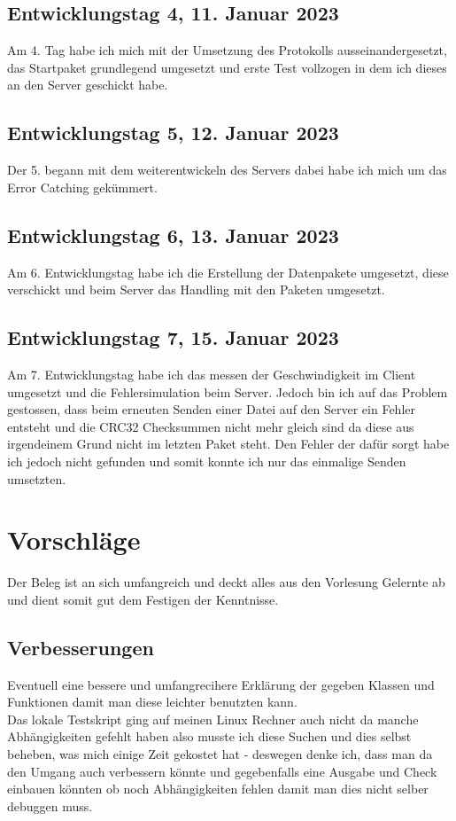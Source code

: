 \documentclass[a4paper,12pt,titlepage]{scrartcl}
\begin{document}
        \subsection{Entwicklungstag 4, 11. Januar 2023}
            Am 4. Tag habe ich mich mit der Umsetzung des Protokolls ausseinandergesetzt, das Startpaket grundlegend umgesetzt und erste Test vollzogen in dem ich dieses an den Server geschickt habe.
        \subsection{Entwicklungstag 5, 12. Januar 2023}
            Der 5. begann mit dem weiterentwickeln des Servers dabei habe ich mich um das Error Catching gekümmert.
        \subsection{Entwicklungstag 6, 13. Januar 2023}
            Am 6. Entwicklungstag habe ich die Erstellung der Datenpakete umgesetzt, diese verschickt und beim Server das Handling mit den Paketen umgesetzt.
        \subsection{Entwicklungstag 7, 15. Januar 2023}
            Am 7. Entwicklungstag habe ich das messen der Geschwindigkeit im Client umgesetzt und die Fehlersimulation beim Server. Jedoch bin ich auf das Problem gestossen, dass beim erneuten Senden einer Datei auf den Server ein Fehler entsteht und die CRC32 Checksummen nicht mehr gleich sind da diese aus irgendeinem Grund nicht im letzten Paket steht. Den Fehler der dafür sorgt habe ich jedoch nicht gefunden und somit konnte ich nur das einmalige Senden umsetzten.
    \newpage
    \section{Vorschläge}
        Der Beleg ist an sich umfangreich und deckt alles aus den Vorlesung Gelernte ab und dient somit gut dem Festigen der Kenntnisse.
        \subsection{Verbesserungen}
            Eventuell eine bessere und umfangrecihere Erklärung der gegeben Klassen und Funktionen damit man diese leichter benutzten kann.\\
            Das lokale Testskript ging auf meinen Linux Rechner auch nicht da manche Abhängigkeiten gefehlt haben also musste ich diese Suchen und dies selbst beheben, was mich einige Zeit gekostet hat - deswegen denke ich, dass man da den Umgang auch verbessern könnte und gegebenfalls eine Ausgabe und Check einbauen könnten ob noch Abhängigkeiten fehlen damit man dies nicht selber debuggen muss.
    \newpage
\end{document}
